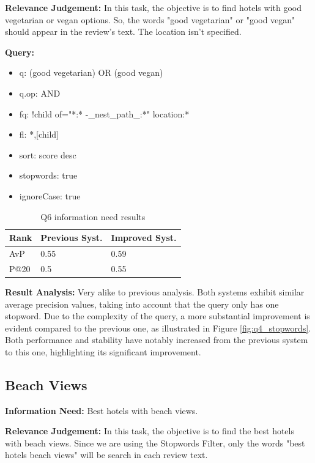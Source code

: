 \documentclass[sigconf]{acmart}
\begin{document}
\textbf{Relevance Judgement:} In this task, the objective is to find hotels with good vegetarian or vegan options. So, the words "good vegetarian" or "good vegan" should appear in the review's text. The location isn't specified.

\textbf{Query:}

\begin{itemize}
    \item q: (good vegetarian) OR (good vegan)
    \item q.op: AND
    \item fq: {!child of="*:* -\_nest\_path\_:*"} location:*
    \item fl: *,[child]
    \item sort: score desc
    \item stopwords: true
    \item ignoreCase: true
\end{itemize}

\begin{table}[H]
\caption{Q6 information need results}
\label{tab:q6}
\begin{tabular}{lll}
\toprule
Rank & Previous Syst. & Improved Syst.\\
\midrule
AvP & 0.55 & 0.59  \\
P@20 & 0.5 & 0.55 \\
\bottomrule
\end{tabular}
\end{table}

\textbf{Result Analysis:} Very alike to previous analysis. Both systems exhibit similar average precision values, taking into account that the query only has one stopword.
Due to the complexity of the query, a more substantial improvement is evident compared to the previous one, as illustrated in Figure \ref{fig:q4_stopwords}. Both performance and stability have notably increased from the previous system to this one, highlighting its significant improvement.

\subsection{Beach Views}

\textbf{Information Need:} Best hotels with beach views.

\textbf{Relevance Judgement:} In this task, the objective is to find the best hotels with beach views. Since we are using the Stopwords Filter, only the words "best hotels beach views" will be search in each review text.
\end{document}

